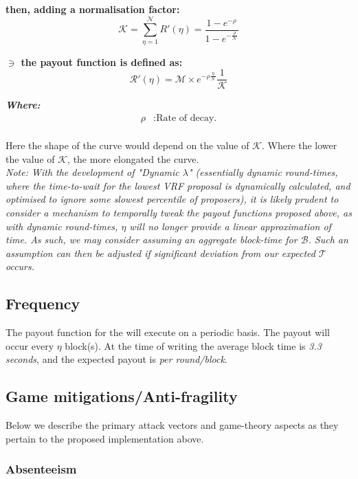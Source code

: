 \documentclass[11pt,a4paper]{article}
\begin{document}
\textbf{then, adding a normalisation factor:}
\[
\mathcal{K} = \sum_{\eta=1}^\mathcal{N}R'(\eta)= \frac{1-e^{-\rho}}{1-e^{-\frac{\rho}{\mathcal{N}}}}
\]

\textbf{$\ni$ the payout function is defined as:}
\[
\mathcal{R'}(\eta)= \mathcal{M}\times e^{-\rho\frac{\eta}{\mathcal{N}}} \frac{1}{\mathcal{K}}
\]

\textbf{\emph{Where:}}
\begin{align*}
\rho & : \text{Rate of decay.} \\
\end{align*}

Here the shape of the curve would depend on the value of \(\mathcal{K}\). Where the lower the value of \(\mathcal{K}\), 
the more elongated the curve. \\

\emph{Note: With the development of "Dynamic $\lambda$" (essentially dynamic round-times, where the time-to-wait for the
lowest VRF proposal is dynamically calculated, and optimised to ignore some slowest percentile of proposers), it is 
likely prudent to consider a mechanism to temporally tweak the payout functions proposed above, as with dynamic 
round-times, $\eta$ will no longer provide a linear approximation of time. As such, we may consider assuming an 
aggregate block-time for $\mathcal{B}$. Such an assumption can then be adjusted if significant deviation from our 
expected $\mathcal{T}$ occurs.}

\subsection{Frequency}
The payout function for the  will execute on a periodic basis. The payout will occur every 
$\eta$ block(s). At the time of writing the average block time is \emph{3.3 seconds}, and the expected payout is 
\textit{per round/block}. 

\pagebreak

\subsection{Game mitigations/Anti-fragility}
Below we describe the primary attack vectors and game-theory aspects as they pertain to the proposed implementation 
above.

\subsubsection{Absenteeism} \label{subsubsec:absenteeism}
\end{document}
